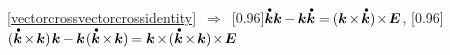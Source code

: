 \begin{otherlanguage}{russian}
\noindent \eqref{vectorcrossvectorcrossidentity} $\,\Rightarrow\,$
\scalebox{0.95}[0.96]{$\mathdotabove{\bm{k}} \bm{k} \hspace{-0.1ex} - \hspace{-0.1ex} \bm{k} \mathdotabove{\bm{k}} = \hspace{-0.16ex} ( \bm{k} \hspace{-0.2ex} \times \hspace{-0.24ex} \mathdotabove{\bm{k}} ) \hspace{-0.32ex} \times \hspace{-0.32ex} \UnitDyad$},\hspace{.4ex}
%
\scalebox{0.95}[0.96]{${\displaystyle ( \mathdotabove{\bm{k}} \hspace{-0.2ex}\times\hspace{-0.24ex} \bm{k} ) \hspace{.2ex} \bm{k} \hspace{-0.1ex} - \hspace{-0.1ex} \bm{k} \hspace{.16ex} ( \mathdotabove{\bm{k}} \hspace{-0.2ex}\times\hspace{-0.24ex} \bm{k} ) \hspace{-0.16ex} = \bm{k} \hspace{-0.2ex} \times \hspace{-0.32ex} ( \mathdotabove{\bm{k}} \hspace{-0.2ex}\times\hspace{-0.24ex} \bm{k} ) \hspace{-0.32ex} \times \hspace{-0.32ex} \UnitDyad}$\hspace{.16ex}}


\end{otherlanguage}
